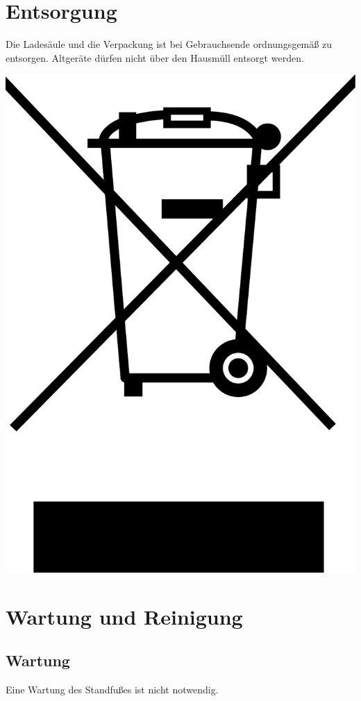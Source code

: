 \documentclass[a4paper,10pt]{article}
\begin{document}
\begin{multicols*}{2}
	\section{Entsorgung}
	\begin{minipage}{0.35\textwidth}
		Die Ladesäule und die Verpackung ist bei Gebrauchsende ordnungsgemäß zu
		entsorgen. Altgeräte dürfen nicht über den Hausmüll entsorgt werden.
	\end{minipage}\hfill
	\begin{minipage}{0.1\textwidth}
		\includegraphics[width=\linewidth]{./img/weee.pdf}
	\end{minipage}


	\section{Wartung und Reinigung}
	\subsection{Wartung}
	Eine Wartung des Standfußes ist nicht notwendig. 


\end{multicols*}
\end{document}
